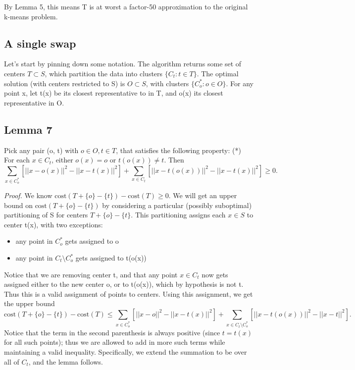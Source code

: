 \documentclass{article}
\begin{document}
By Lemma 5, this means T is at worst a factor-50 approximation to the original k-means problem.

\subsection{A single swap}

Let's start by pinning down some notation. The algorithm returns some set of centers $T \subset S$, which partition the data into clusters $\{C_t : t \in T\}$. The optimal solution (with centers restricted to S) is $O \subset S$, with clusters $\{C_o^* : o \in O\}$. For any point x, let t(x) be its closest representative to in T, and o(x) its closest representative in O.

\subsection*{Lemma 7}
Pick any pair (o, t) with $o \in O, t \in T$, that satisfies the following property:
(*) For each $x \in C_t$, either $o(x) = o$ or $t(o(x)) \neq t$.
Then
\[ \sum_{x \in C_o^*} [||x - o(x)||^2 - ||x - t(x)||^2] + \sum_{x \in C_t} [||x - t(o(x))||^2 - ||x - t(x)||^2] \ge 0. \]

\textit{Proof.} We know $\text{cost}(T + \{o\} - \{t\}) - \text{cost}(T) \ge 0$. We will get an upper bound on $\text{cost}(T + \{o\} - \{t\})$ by considering a particular (possibly suboptimal) partitioning of S for centers $T + \{o\} - \{t\}$. This partitioning assigns each $x \in S$ to center t(x), with two exceptions:
\begin{itemize}
    \item any point in $C_o^*$ gets assigned to o
    \item any point in $C_t \setminus C_o^*$ gets assigned to t(o(x))
\end{itemize}
Notice that we are removing center t, and that any point $x \in C_t$ now gets assigned either to the new center o, or to t(o(x)), which by hypothesis is not t. Thus this is a valid assignment of points to centers.
Using this assignment, we get the upper bound
\[ \text{cost}(T + \{o\} - \{t\}) - \text{cost}(T) \le \sum_{x \in C_o^*} [||x - o||^2 - ||x - t(x)||^2] + \sum_{x \in C_t \setminus C_o^*} [||x - t(o(x))||^2 - ||x - t||^2]. \]
Notice that the term in the second parenthesis is always positive (since $t = t(x)$ for all such points); thus we are allowed to add in more such terms while maintaining a valid inequality. Specifically, we extend the summation to be over all of $C_t$, and the lemma follows.
\end{document}
